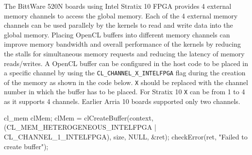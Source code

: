 The BittWare 520N boards using Intel Stratix 10 FPGA provides 4 external memory channels
to access the global memory. Each of the
4 external memory channels can be used parallely by the kernels to read and write data
into the global memory. Placing OpenCL buffers into different memory channels can
improve memory bandwidth and overall performance of the kernels by reducing the stalls
for simultaneous memory requests and reducing the latency of memory reads/writes.
A OpenCL buffer can be configured in the host code to be placed in a specific channel
by using the \texttt{CL\_CHANNEL\_X\_INTELFPGA} flag during the creation of the memory
as shown in the code below. \texttt{X} should be replaced with the channel number in which
the buffer has to be placed. For Stratix 10 \texttt{X} can be from 1 to 4 as it supports 4 channels.
Earlier Arria 10 boards supported only two channels.
\begin{CppCode}
cl_mem clMem;
clMem = clCreateBuffer(context, (CL_MEM_HETEROGENEOUS_INTELFPGA | CL_CHANNEL_1_INTELFPGA), size, NULL, &ret);
checkError(ret, "Failed to create buffer");
\end{CppCode}

